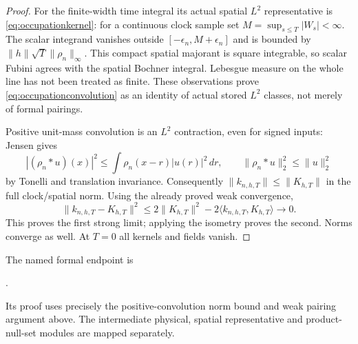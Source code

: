 \documentclass[11pt]{article}
\begin{document}
\begin{proof}
For the finite-width time integral its actual spatial $L^2$
representative is \eqref{eq:occupationkernel}: for a continuous clock
sample set $M=\sup_{s\leq T}|W_s|<\infty$. The scalar integrand
vanishes outside $[-\epsilon_n,M+\epsilon_n]$ and is bounded by
$\|h\|\sqrt T\|\rho_n\|_\infty$. This compact spatial majorant is
square integrable, so scalar Fubini agrees with the spatial Bochner
integral. Lebesgue measure on the whole line has not been treated as
finite. These observations prove \eqref{eq:occupationconvolution} as an
identity of actual stored $L^2$ classes, not merely of formal pairings.

Positive unit-mass convolution is an $L^2$ contraction, even for signed
inputs: Jensen gives
\[
 |(\rho_n*u)(x)|^2\leq\int\rho_n(x-r)|u(r)|^2\,dr,
 \qquad \|\rho_n*u\|_2^2\leq\|u\|_2^2
\]
by Tonelli and translation invariance. Consequently
$\|k_{n,h,T}\|\leq\|K_{h,T}\|$ in the full clock/spatial norm.
Using the already proved weak convergence,
\[
 \|k_{n,h,T}-K_{h,T}\|^2
 \leq2\|K_{h,T}\|^2-2\langle k_{n,h,T},K_{h,T}\rangle
 \longrightarrow0.
\]
This proves the first strong limit; applying the isometry proves the
second. Norms converge as well. At $T=0$ all kernels and fields vanish.
\end{proof}
The named formal endpoint is
\par\noindent{}.
\par\noindent Its proof uses precisely the positive-convolution norm
bound and weak pairing argument above. The intermediate physical,
spatial representative and product-null-set modules are mapped separately.
\end{document}
